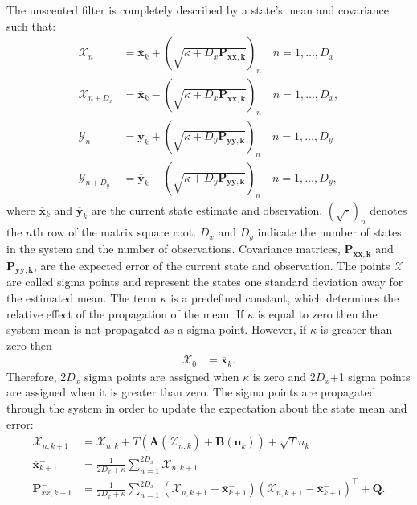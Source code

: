 \documentclass{article}%
\begin{document}
The unscented filter is completely described by a state's mean and covariance such that:\begin{align}
\label{eqn: Unscented_Transform1}
\mathbf{\mathcal{X}}_{n} &= \mathbf{\overline{x}}_{k} + (\sqrt{\kappa+D_{x}\mathbf{P_{xx,k}}})_{n} \quad n=1,\hdots,D_x\\
\label{eqn: Unscented_Transform2}
\mathbf{\mathcal{X}}_{n+D_{x}} &= \mathbf{\overline{x}}_{k} - (\sqrt{\kappa+D_{x}\mathbf{P_{xx,k}}})_{n} \quad n=1,\hdots,D_x,\\
\label{eqn: Unscented_TransformY1}
\mathbf{\mathcal{Y}}_{n} &= \mathbf{\overline{y}}_{k} + (\sqrt{\kappa+D_{y}\mathbf{P_{yy,k}}})_{n} \quad n=1,\hdots,D_y\\
\label{eqn: Unscented_TransformY2}
\mathbf{\mathcal{Y}}_{n+D_{y}} &= \mathbf{\overline{y}}_{k} - (\sqrt{\kappa+D_{y}\mathbf{P_{yy,k}}})_{n} \quad n=1,\hdots,D_y,
\end{align} where $\mathbf{\overline{x}}_{k}$ and $\mathbf{\overline{y}}_{k}$ are the current state estimate and observation. $(\sqrt{\cdot})_{n}$ denotes the $n$th row of the matrix square root. $D_{x}$ and $D_{y}$ indicate the number of states in the system and the number of observations. Covariance matrices, $\mathbf{P_{xx,k}}$ and $\mathbf{P_{yy,k}}$, are the expected error of the current state and observation. The points $\mathbf{\mathcal{X}}$ are called sigma points and represent the states one standard deviation away for the estimated mean. The term $\kappa$ is a predefined constant, which determines the relative effect of the propagation of the mean. If $\kappa$ is equal to zero then the system mean is not propagated as a sigma point. However, if $\kappa$ is greater than zero then \begin{align}
\mathbf{\mathcal{X}}_{0} &= \mathbf{\overline{x}}_{k}.
\end{align} Therefore, 2$D_{x}$ sigma points are assigned when $\kappa$ is zero and 2$D_{x}$+1 sigma points are assigned when it is greater than zero. The sigma points are propagated through the system in order to update the expectation about the state mean and error: \begin{align}%
\mathbf{\mathcal{X}}_{n,k+1} &= \mathbf{\mathcal{X}}_{n,k}+ T(\mathbf{A}(\mathbf{\mathcal{X}}_{n,k}) +\mathbf{B}(\mathbf{u}_{k})) +\sqrt{T}{n}_{k}\\
\overline{\mathbf{x}}_{k+1}^{-} &= \frac{1}{2D_{x}+\kappa}\sum_{n=1}^{2D_{x}} \mathbf{\mathcal{X}}_{n,k+1}\\
\mathbf{P}_{xx,k+1}^{-} &= \frac{1}{2D_{x}+\kappa}\sum_{n=1}^{2D_{x}} (\mathbf{\mathcal{X}}_{n,k+1} -\mathbf{\overline{x}}_{k+1}^{-})(\mathbf{\mathcal{X}}_{n,k+1}-\mathbf{\overline{x}}_{k+1}^{-})^{\top} + \mathbf{Q}.%

\end{align}
\end{document}

